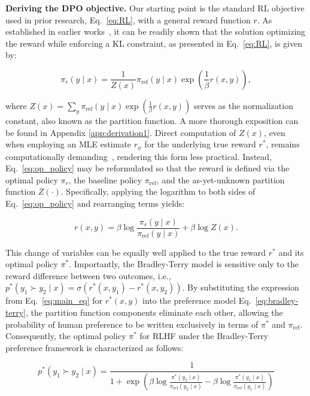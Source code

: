\textbf{Deriving the DPO objective.} Our starting point is the standard RL objective used in prior research, Eq.~\ref{eq:RL}, with a general reward function $r$. As established in earlier works~\citep{peters2007reinforcement, peng2019advantage, korbak2022reinforcement, go2023aligning}, it can be readily shown that the solution optimizing the reward while enforcing a KL constraint, as presented in Eq.~\ref{eq:RL}, is given by:

\begin{equation}\label{eq:op_policy}
    \pi_r(y\mid x) = \frac{1}{Z(x)}\pi_\text{ref}(y\mid x)\exp\left(\frac{1}{\beta}r(x, y)\right),
\end{equation}

where $Z(x) =\sum_{y}\pi_\text{ref}(y\mid x)\exp\left(\frac{1}{\beta}r(x, y)\right)$ serves as the normalization constant, also known as the partition function. A more thorough exposition can be found in Appendix \ref{app:derivation1}. Direct computation of $Z(x)$, even when employing an MLE estimate $r_{\phi}$ for the underlying true reward $r^*$, remains computationally demanding~\citep{korbak2022reinforcement, go2023aligning}, rendering this form less practical. Instead, Eq.~\ref{eq:op_policy} may be reformulated so that the reward is defined via the optimal policy $\pi_r$, the baseline policy $\pi_\text{ref}$, and the as-yet-unknown partition function $Z(\cdot)$. Specifically, applying the logarithm to both sides of Eq.~\ref{eq:op_policy} and rearranging terms yields:

\begin{equation}\label{eq:main_eq}
    r(x,y) =\beta \log \frac{\pi_r(y\mid x)}{\pi_\text{ref}(y\mid x)} + \beta \log Z(x).
\end{equation}

This change of variables can be equally well applied to the true reward $r^*$ and its optimal policy $\pi^*$. Importantly, the Bradley-Terry model is sensitive only to the reward difference between two outcomes, i.e., ${p^*(y_1 \succ y_2 \mid x) = \sigma(r^*(x, y_1) - r^*(x, y_2))}$. By substituting the expression from Eq.~\ref{eq:main_eq} for $r^*(x,y)$ into the preference model Eq.~\ref{eq:bradley-terry}, the partition function components eliminate each other, allowing the probability of human preference to be written exclusively in terms of $\pi^*$ and $\pi_\text{ref}$. Consequently, the optimal policy $\pi^*$ for RLHF under the Bradley-Terry preference framework is characterized as follows:

\begin{equation}\label{eq:objective}
    p^*(y_1\succ y_2 \mid x)=\frac{1}{1 + \exp\left(\beta \log \frac{\pi^*(y_2\mid x)}{\pi_\text{ref}(y_2\mid x)} - \beta \log \frac{\pi^*(y_1\mid x)}{\pi_\text{ref}(y_1\mid x)}\right)}
\end{equation}

